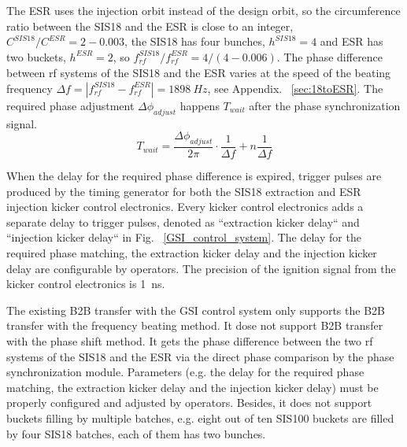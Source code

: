 The ESR uses the injection orbit instead of the design orbit, so the circumference ratio between the SIS18 and the ESR is close to an integer, $C^{\mathit{SIS18}}/C^{\mathit{ESR}}=2-0.003$, the SIS18 has four bunches, $h^{\mathit{SIS18}}=4$ and ESR has two buckets, $h^{\mathit{ESR}}=2$, so $f^{\mathit{SIS18}}_{\mathit{rf}}/f^{\mathit{ESR}}_{\mathit{rf}}=4/(4-0.006)$. The phase difference between rf systems of the SIS18 and the ESR varies at the speed of the beating frequency $\Delta f=|f^{\mathit{SIS18}}_{\mathit{rf}}-f^{\mathit{ESR}}_{\mathit{rf}}|=\SI{1898}{Hz}$, see Appendix. ~\ref{sec:18toESR}. The required phase adjustment $\Delta\phi_\mathit{adjust}$ happens $T_\mathit{wait}$ after the phase synchronization signal. 
\begin{equation}
T_\mathit{wait}= \frac{\Delta \phi_\mathit{adjust}}{2\pi}\cdot\frac{1}{\Delta f}+n\frac{1}{\Delta f}\label{time_delay_beating}
\end{equation}

When the delay for the required phase difference is expired, trigger pulses are produced by the timing generator for both the SIS18 extraction and ESR injection kicker control electronics. Every kicker control electronics adds a separate delay to trigger pulses, denoted as ``extraction kicker delay`` and ``injection kicker delay`` in Fig. ~\ref{GSI_control_system}. The delay for the required phase matching, the extraction kicker delay and the injection kicker delay are configurable by operators. The precision of the ignition signal from the kicker control electronics is \SI{1}{ns}. 

The existing B2B transfer with the GSI control system only supports the B2B transfer with the frequency beating method. It dose not support B2B transfer with the phase shift method. It gets the phase difference between the two rf systems of the SIS18 and the ESR via the direct phase comparison by the phase synchronization module. Parameters (e.g. the delay for the required phase matching, the extraction kicker delay and the injection kicker delay) must be properly configured and adjusted by operators. Besides, it does not support buckets filling by multiple batches, e.g. eight out of ten SIS100 buckets are filled by four SIS18 batches, each of them has two bunches.

